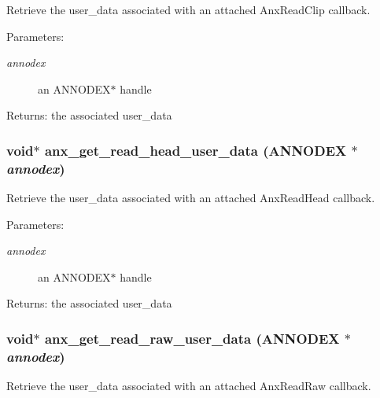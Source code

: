 Retrieve the user\_\-data associated with an attached Anx\-Read\-Clip callback. 

\begin{Desc}
\item[Parameters:]
\begin{description}
\item[{\em annodex}]an ANNODEX$\ast$ handle \end{description}
\end{Desc}
\begin{Desc}
\item[Returns:]the associated user\_\-data \end{Desc}
\subsubsection{\setlength{\rightskip}{0pt plus 5cm}void$\ast$ anx\_\-get\_\-read\_\-head\_\-user\_\-data ({\bf ANNODEX} $\ast$ {\em annodex})}\label{anx__read_8h_a10}


Retrieve the user\_\-data associated with an attached Anx\-Read\-Head callback. 

\begin{Desc}
\item[Parameters:]
\begin{description}
\item[{\em annodex}]an ANNODEX$\ast$ handle \end{description}
\end{Desc}
\begin{Desc}
\item[Returns:]the associated user\_\-data \end{Desc}
\subsubsection{\setlength{\rightskip}{0pt plus 5cm}void$\ast$ anx\_\-get\_\-read\_\-raw\_\-user\_\-data ({\bf ANNODEX} $\ast$ {\em annodex})}\label{anx__read_8h_a14}


Retrieve the user\_\-data associated with an attached Anx\-Read\-Raw callback. 

